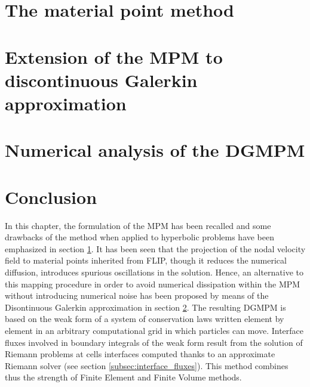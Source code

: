 \section{The material point method}
\label{sec:MPM}


\section{Extension of the MPM to discontinuous Galerkin approximation}
\label{sec:DGMPM}


\section{Numerical analysis of the DGMPM}
\label{sec:DGMPM_analysis}


\section*{Conclusion}
In this chapter, the formulation of the MPM has been recalled and some drawbacks of the method when applied to hyperbolic problems have been emphasized in section \ref{sec:MPM}. It has been seen that the projection of the nodal velocity field to material points inherited from FLIP, though it reduces the numerical diffusion, introduces spurious oscillations in the solution. Hence, an alternative to this mapping procedure in order to avoid numerical dissipation within the MPM without introducing numerical noise has been proposed by means of the Disontinuous Galerkin approximation in section \ref{sec:DGMPM}. The resulting DGMPM is based on the weak form of a system of conservation laws written element by element in an arbitrary computational grid in which particles can move. Interface fluxes involved in boundary integrals of the weak form result from the solution of Riemann problems at cells interfaces computed thanks to an approximate Riemann solver (see section \ref{subsec:interface_fluxes}). This method combines thus the strength of Finite Element and Finite Volume methods.

